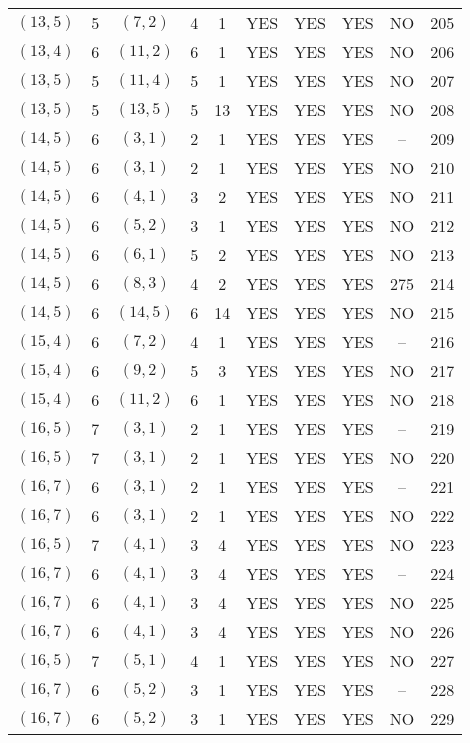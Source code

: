 \begin{longtable}{|c|c|c|c|c|c|c|c|c|c|}
$(13, 5)$ & 5 & $(7, 2)$ & 4 & 1 & YES & YES & YES & NO & 205\\
$(13, 4)$ & 6 & $(11, 2)$ & 6 & 1 & YES & YES & YES & NO & 206\\
$(13, 5)$ & 5 & $(11, 4)$ & 5 & 1 & YES & YES & YES & NO & 207\\
$(13, 5)$ & 5 & $(13, 5)$ & 5 & 13 & YES & YES & YES & NO & 208\\
$(14, 5)$ & 6 & $(3, 1)$ & 2 & 1 & YES & YES & YES & -- & 209\\
$(14, 5)$ & 6 & $(3, 1)$ & 2 & 1 & YES & YES & YES & NO & 210\\
$(14, 5)$ & 6 & $(4, 1)$ & 3 & 2 & YES & YES & YES & NO & 211\\
$(14, 5)$ & 6 & $(5, 2)$ & 3 & 1 & YES & YES & YES & NO & 212\\
$(14, 5)$ & 6 & $(6, 1)$ & 5 & 2 & YES & YES & YES & NO & 213\\
$(14, 5)$ & 6 & $(8, 3)$ & 4 & 2 & YES & YES & YES & 275 & 214\\
$(14, 5)$ & 6 & $(14, 5)$ & 6 & 14 & YES & YES & YES & NO & 215\\
$(15, 4)$ & 6 & $(7, 2)$ & 4 & 1 & YES & YES & YES & -- & 216\\
$(15, 4)$ & 6 & $(9, 2)$ & 5 & 3 & YES & YES & YES & NO & 217\\
$(15, 4)$ & 6 & $(11, 2)$ & 6 & 1 & YES & YES & YES & NO & 218\\
$(16, 5)$ & 7 & $(3, 1)$ & 2 & 1 & YES & YES & YES & -- & 219\\
$(16, 5)$ & 7 & $(3, 1)$ & 2 & 1 & YES & YES & YES & NO & 220\\
$(16, 7)$ & 6 & $(3, 1)$ & 2 & 1 & YES & YES & YES & -- & 221\\
$(16, 7)$ & 6 & $(3, 1)$ & 2 & 1 & YES & YES & YES & NO & 222\\
$(16, 5)$ & 7 & $(4, 1)$ & 3 & 4 & YES & YES & YES & NO & 223\\
$(16, 7)$ & 6 & $(4, 1)$ & 3 & 4 & YES & YES & YES & -- & 224\\
$(16, 7)$ & 6 & $(4, 1)$ & 3 & 4 & YES & YES & YES & NO & 225\\
$(16, 7)$ & 6 & $(4, 1)$ & 3 & 4 & YES & YES & YES & NO & 226\\
$(16, 5)$ & 7 & $(5, 1)$ & 4 & 1 & YES & YES & YES & NO & 227\\
$(16, 7)$ & 6 & $(5, 2)$ & 3 & 1 & YES & YES & YES & -- & 228\\
$(16, 7)$ & 6 & $(5, 2)$ & 3 & 1 & YES & YES & YES & NO & 229\\

\end{longtable}
